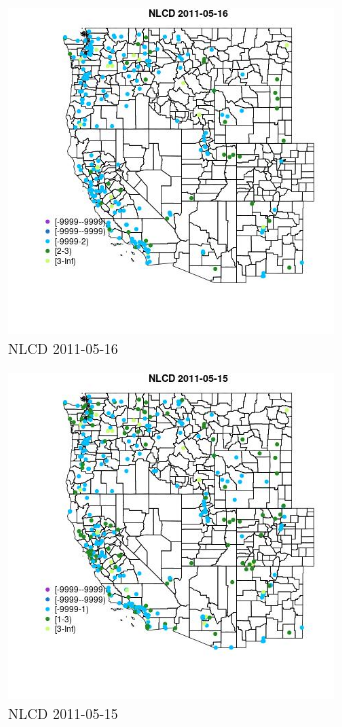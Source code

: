 \begin{figure} 
\centering  
\includegraphics[width=0.77\textwidth]{Code_Outputs/ML_input_report_ML_input_PM25_Step5_part_d_de_duplicated_aves_ML_input_MapObsNLCD2011-05-16.jpg} 
\caption{\label{fig:ML_input_report_ML_input_PM25_Step5_part_d_de_duplicated_aves_ML_inputMapObsNLCD2011-05-16}NLCD 2011-05-16} 
\end{figure} 
 

\begin{figure} 
\centering  
\includegraphics[width=0.77\textwidth]{Code_Outputs/ML_input_report_ML_input_PM25_Step5_part_d_de_duplicated_aves_ML_input_MapObsNLCD2011-05-15.jpg} 
\caption{\label{fig:ML_input_report_ML_input_PM25_Step5_part_d_de_duplicated_aves_ML_inputMapObsNLCD2011-05-15}NLCD 2011-05-15} 
\end{figure} 
 

